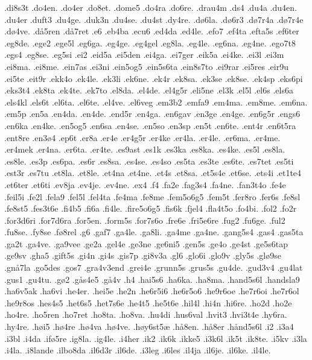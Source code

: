 {.di8s3t
.do4en.
.do4er
.do8et.
.dome5
.do4ra
.do6re.
.drau4m
.ds4
.du4a
.du4en.
.du4er
.duft3
.du4ge.
.duk3n
.du4se.
.du4st
.dy4re.
.d^^f86la.
.d^^f86r3
.d^^f87r4a
.d^^f87r4e
.d^^f84ve.
.d^^e55ren
.d^^e57ret
.e6
.eb4ba
.ecu6
.ed4da
.ed4le.
.efo7
.ef4ta
.efta5s
.ef6ter
.eg8de.
.ege2
.ege5l
.eg6ga.
.eg4ge.
.eg4gel
.eg8la.
.eg4le.
.eg6na.
.eg4ne.
.ego7t8
.egs4
.eg8se.
.eg5si
.ei2
.eid5a
.ei5den
.ei4ga.
.ei7ger
.eik5a
.ei4ke.
.ei3l
.ei3m
.ei8ma.
.ei8me.
.ein7as
.ei3ni
.ein5og5
.ein5s6ta
.ein8s7to
.ei9rar
.ei5res
.eir9u
.ei5te
.eit9r
.ekk4o
.ek4le.
.ek3li
.ek6ne.
.ek4r
.ek8sa.
.ek3se
.ek8se.
.ek4sp
.eks6pi
.eks3t4
.ek8ta
.ek4te.
.ek7to
.el8da.
.el4de.
.el4g5r
.eli5ne
.el3k
.el5l
.el6s
.els6a
.els4kl
.els6t
.el6ta.
.el6te.
.el4ve.
.el6veg
.em3b2
.emfa9
.em4ma.
.em8me.
.em6na.
.em5p
.en5a
.en4da.
.en4de.
.end5r
.en4ga.
.en6gav
.en3ge
.en4ge.
.en6g5r
.engs6
.en6ka
.en4ke.
.en5og5
.en6sa
.en4se.
.en5so
.en3sp
.en5t
.en6te.
.ent4r
.en6t5ra
.ent8re
.en3^^f84
.ep6t
.er8a
.er4e
.er4g5r
.er4ke
.er4la.
.er4le.
.er6ma.
.er4me.
.er4mek
.er4na.
.er6ta.
.er4te.
.es9ast
.es1k
.es3ka
.es8ka.
.es4ke.
.es5l
.es8la.
.es8le.
.es3p
.es6pa.
.es6r
.es8sa.
.es4se.
.es4so
.es5ta
.es3te
.es6te.
.es7tet
.es5ti
.est3r
.es7tu
.et8la.
.et8le.
.et4na
.et4ne.
.et4s
.et8sa.
.et5s4e
.et6se.
.ets4i
.et1te4
.et6ter
.et6ti
.ev8ja
.ev4je.
.ev4ne.
.ex4
.f4
.fa2e
.fag3s4
.fa4ne.
.fan3t4o
.fe4e
.feil5i
.fe2l
.fela9
.fel5l
.fel4ta
.fe4ma
.fe8me
.fem5o6g5
.fem5t
.fer8ro
.fer6s
.fe8sl
.fe8st5
.fes3t6e
.fi4b5
.fi6a
.fi4le.
.fire5o6g5
.fis6k
.fjel4
.fla4t5o
.fo4bi.
.fol2
.fo2r
.for3d6ri
.for7d6ra
.for5en.
.form5s
.for7s6o
.fre6e
.fri5e6re
.fug2
.fu6ge.
.ful2
.fu8se.
.fy8se
.f^^f88rel
.g6
.gaf7
.ga4le.
.ga8li.
.ga4me
.ga4ne.
.gang5s4
.gas4
.gas5ta
.ga2t
.ga4ve.
.ga9vee
.ge2a
.gel4e
.ge3ne
.ge6ni5
.gen5s
.ge4o
.ge4st
.ge5s6tap
.ge9sv
.gha5
.gift5s
.gi4n
.gi4s
.gis7p
.gi8v3a
.gl6
.glo6i
.glo9v
.gly5s
.gl^^f89se
.gn^^e57la
.go5des
.gos7
.gra4v3end
.grei4e
.grunn5s
.grus5s
.gu4de.
.gud3v4
.gu4lat
.gus1
.gu4tu.
.g^^f82
.g^^e5s4e5
.g^^e54v
.h4
.hai5s6
.ha6ka.
.ha8ma.
.hand5s6l
.handsla9
.ha6v5ak
.ha6vi
.he4er.
.hei5e
.he2n
.he6r5i6
.he6r5o6
.he9r6oe
.he7r6oi
.he7r6ol
.he9r8os
.hes4s5
.het6s5
.het7s6e
.he4t5
.he5t6e
.hil4l
.hi4n
.hi6re.
.ho2d
.ho2e
.ho4re.
.ho5ren
.ho7ret
.ho8ta.
.ho8va.
.hu4di
.hus6val
.hvit3
.hvi3t4e
.hy6ra.
.hy4re.
.h^^f8i5
.h^^f84re
.h^^f84va
.h^^f84ve.
.h^^f8y6st5^^e6
.h^^e58en.
.h^^e58er
.h^^e5nd5s6l
.i2
.i3a4
.i3bl
.i4da
.if^^f85re
.ig8la.
.ig4le.
.i4her
.ik2
.ik6k
.ikke5
.i3k6l
.ik5t
.ik8te.
.i5kv
.i3la
.i4la.
.i8lande
.ilbo8da
.il6d3r
.il6de.
.i3leg
.i6les
.il4ja
.il6je.
.il6ke.
.il4le.
}
